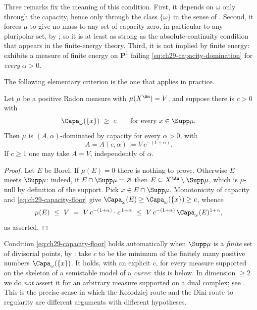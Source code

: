 Three remarks fix the meaning of this condition.  First, it depends on
\(\omega\) only through the capacity, hence only through the class
\(\{\omega\}\) in the sense of
.  Second, it forces \(\mu\) to give no
mass to any set of capacity zero, in particular to any pluripolar set, by
; so it is at least as strong as the
absolute-continuity condition that appears in the finite-energy theory.
Third, it is not implied by finite energy:  exhibits
a measure of finite energy on \(\mathbf P^1\) failing
\eqref{eq:ch29-capacity-domination} for \emph{every} \(\alpha>0\).

The following elementary criterion is the one that applies in practice.

\begin{lemma}
\label{lem:ch29-capacity-floor}
Let \(\mu\) be a positive Radon measure with \(\mu(X^{\An})=V\), and suppose
there is \(c>0\) with
\begin{equation}
\label{eq:ch29-capacity-floor}
 \Capa_\omega(\{x\})\ \geq\ c
 \qquad\text{for every }x\in\Supp\mu .
\end{equation}
Then \(\mu\) is \((A,\alpha)\)-dominated by capacity for every
\(\alpha>0\), with
\[
 A=A(c,\alpha):=V\,c^{-(1+\alpha)} .
\]
If \(c\geq1\) one may take \(A=V\), independently of \(\alpha\).
\end{lemma}

\begin{proof}
Let \(E\) be Borel.  If \(\mu(E)=0\) there is nothing to prove.  Otherwise
\(E\) meets \(\Supp\mu\): indeed, if \(E\cap\Supp\mu=\varnothing\) then
\(E\subseteq X^{\An}\setminus\Supp\mu\), which is \(\mu\)-null by
definition of the support.  Pick \(x\in E\cap\Supp\mu\).  Monotonicity of
capacity and \eqref{eq:ch29-capacity-floor} give
\(\Capa_\omega(E)\geq\Capa_\omega(\{x\})\geq c\), whence
\[
 \mu(E)\ \leq\ V
 \ =\ V\,c^{-(1+\alpha)}\cdot c^{\,1+\alpha}
 \ \leq\ V\,c^{-(1+\alpha)}\,\Capa_\omega(E)^{1+\alpha},
\]
as asserted.
\end{proof}

\begin{remark}
\label{rem:ch29-floor-availability}
Condition \eqref{eq:ch29-capacity-floor} holds automatically when
\(\Supp\mu\) is a \emph{finite} set of divisorial points, by
: take \(c\) to be the minimum of the
finitely many positive numbers \(\Capa_\omega(\{x\})\).  It holds, with an
explicit \(c\), for every measure supported on the skeleton of a semistable
model of a \emph{curve}: this is 
below.  In dimension \(\geq2\) we do \emph{not} assert it for an arbitrary
measure supported on a dual complex; see
.  This is the precise sense in which the
Ko\l odziej route and the Dini route to regularity are different arguments
with different hypotheses.
\end{remark}

